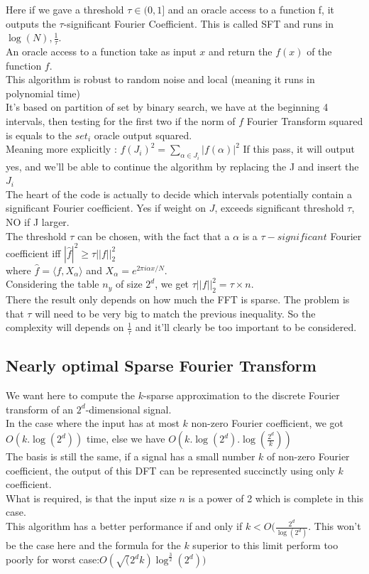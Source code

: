 \documentclass{article}
\begin{document}
Here if we gave a threshold $\tau \in (0,1]$ and an oracle access to a function f, it outputs the $\tau$-significant Fourier Coefficient. This is called SFT and runs in $\log(N),\frac{1}{\tau}$.\\
An oracle access to a function take as input $x$ and return the $f(x)$ of the function $f$.\\
This algorithm is robust to random noise and local (meaning it runs in polynomial time)\\
It's based on partition of set by binary search, we have at the beginning 4 intervals, then testing for the first two if the norm of $f$ Fourier Transform squared is equals to the $set_i$ oracle output squared.\\
Meaning more explicitly : $f(J_i)^2 = \sum_{\alpha \in J_i}{|f(\alpha)|^2}$ If this pass, it will output yes, and we'll be able to continue the algorithm by replacing the J and insert the $J_i$\\
The heart of the code is actually to decide which intervals potentially contain a significant Fourier coefficient. Yes if weight on $J$, exceeds significant threshold $\tau$, NO if J larger.\\
The threshold $\tau$ can be chosen, with the fact that a $\alpha$ is a $\tau -significant$ Fourier coefficient iff $|\hat{f}|^2 \geq \tau||f||^{2}_2$\\ where $\hat{f} = \langle f,X_{\alpha} \rangle$ and $X_{\alpha} = e^{2\pi i \alpha x/N}$.\\
Considering the table $n_y$ of size $2^d$, we get $\tau||f||^{2}_2 = \tau \times n$.\\
There the result only depends on how much the FFT is sparse.
The problem is that $\tau$ will need to be very big to match the previous inequality. So the complexity will depends on $\frac{1}{\tau}$ and it'll clearly be too important to be considered.\\

\subsection{Nearly optimal Sparse Fourier Transform}

We want here to compute the $k$-sparse approximation to the discrete Fourier transform of an $2^d$-dimensional signal.\\
In the case where the input has at most $k$ non-zero Fourier coefficient, we got $O(k.\log(2^d))$ time, else we have $O(k.\log(2^d).\log(\frac{2^d}{k}))$\\
The basis is still the same, if a signal has a small number $k$ of non-zero Fourier coefficient, the output of this DFT can be represented succinctly using only $k$ coefficient.\\
What is required, is that the input size $n$ is a power of 2 which is complete in this case.\\
This algorithm has a better performance if and only if $ k < O(\frac{2^d}{\log(2^d)}$. This won't be the case here and the formula for the $k$ superior to this limit perform too poorly for worst case:$O(\sqrt(2^d k) \log^{\frac{3}{2}}(2^d))$
\end{document}
